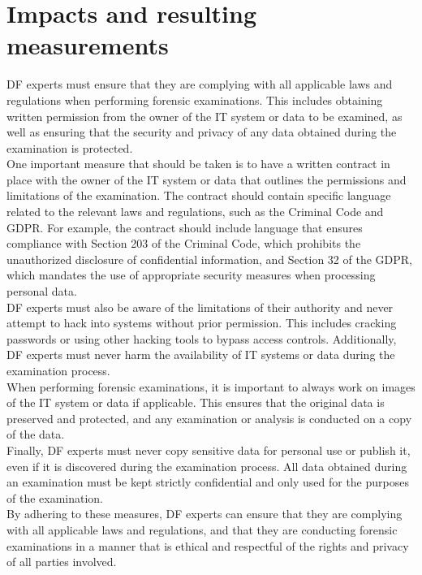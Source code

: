 \documentclass{scrreprt}
\begin{document}
\section{Impacts and resulting measurements}
DF experts must ensure that they are complying with all applicable laws and regulations when performing forensic examinations. This includes obtaining written permission from the owner of the IT system or data to be examined, as well as ensuring that the security and privacy of any data obtained during the examination is protected.
\\\linebreak One important measure that should be taken is to have a written contract in place with the owner of the IT system or data that outlines the permissions and limitations of the examination. The contract should contain specific language related to the relevant laws and regulations, such as the Criminal Code and GDPR. For example, the contract should include language that ensures compliance with Section 203 of the Criminal Code, which prohibits the unauthorized disclosure of confidential information, and Section 32 of the GDPR, which mandates the use of appropriate security measures when processing personal data.
\\\linebreak DF experts must also be aware of the limitations of their authority and never attempt to hack into systems without prior permission. This includes cracking passwords or using other hacking tools to bypass access controls. Additionally, DF experts must never harm the availability of IT systems or data during the examination process.
\\\linebreak When performing forensic examinations, it is important to always work on images of the IT system or data if applicable. This ensures that the original data is preserved and protected, and any examination or analysis is conducted on a copy of the data.
\\\linebreak Finally, DF experts must never copy sensitive data for personal use or publish it, even if it is discovered during the examination process. All data obtained during an examination must be kept strictly confidential and only used for the purposes of the examination.
\\\linebreak By adhering to these measures, DF experts can ensure that they are complying with all applicable laws and regulations, and that they are conducting forensic examinations in a manner that is ethical and respectful of the rights and privacy of all parties involved.
\end{document}

